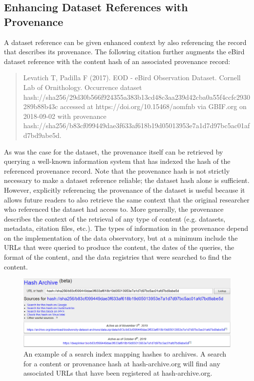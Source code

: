 \documentclass[10pt,letterpaper]{article}
\begin{document}
\subsection*{Enhancing Dataset References with Provenance}

A dataset reference can be given enhanced context by also referencing the record that describes its provenance. The following citation further augments the eBird dataset reference with the content hash of an associated provenance record:

\begin{quote}
    Levatich T, Padilla F (2017). EOD - eBird Observation Dataset. Cornell Lab of Ornithology. Occurrence dataset hash://sha256/29d30b566f924355a383b13cd48c3aa239d42cba0a55f4ccfc2930289b88b43c accessed at https://doi.org/10.15468/aomfnb via GBIF.org on 2018-09-02 with provenance hash://sha256/b83cf099449dae3f633af618b19d05013953e7a1d7d97bc5ac01afd7bd9abe5d.
\end{quote}

As was the case for the dataset, the provenance itself can be retrieved by querying a well-known information system that has indexed the hash of the referenced provenance record. Note that the provenance hash is not strictly necessary to make a dataset reference reliable; the dataset hash alone is sufficient. However, explicitly referencing the provenance of the dataset is useful because it allows future readers to also retrieve the same context that the original researcher who referenced the dataset had access to. More generally, the provenance describes the context of the retrieval of any type of content (e.g. datasets, metadata, citation files, etc.). The types of information in the provenance depend on the implementation of the data observatory, but at a minimum include the URLs that were queried to produce the content, the dates of the queries, the format of the content, and the data registries that were searched to find the content.

\begin{figure}[ht] %


\includegraphics[width=\textwidth]{figure5.jpg}

\caption{An example of a search index mapping hashes to archives. A search for a content or provenance hash at hash-archive.org will find any associated URLs that have been registered at hash-archive.org.}

\label{fig5} %

\end{figure}
\end{document}
